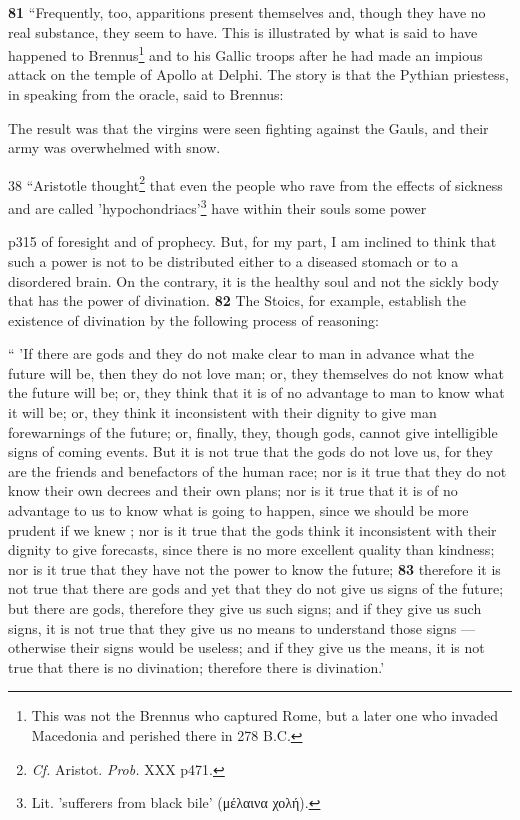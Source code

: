 \textbf{81} ``Frequently, too, apparitions present themselves and, though they have no real substance, they seem to have. This is illustrated by what is said to have happened to Brennus\texthebrew{}\footnote{This was not the Brennus who captured Rome, but a later one who invaded Macedonia and perished there in 278 B.C.

} and to his Gallic troops after he had made an impious attack on the temple of Apollo at Delphi. The story is that the Pythian priestess, in speaking from the oracle, said to Brennus:

The result was that the virgins were seen fighting against the Gauls, and their army was overwhelmed with snow.

38
``Aristotle thought\texthebrew{}\footnote{\emph{Cf.} Aristot. \emph{Prob.} XXX p471.

} that even the people who rave from the effects of sickness and are called 'hypochondriacs'\texthebrew{}\footnote{Lit. 'sufferers from black bile' (\textgreek{μέλαινα χολή}).

} have within their souls some power

p315 of foresight and of prophecy. But, for my part, I am inclined to think that such a power is not to be distributed either to a diseased stomach or to a disordered brain. On the contrary, it is the healthy soul and not the sickly body that has the power of divination. \textbf{82} The Stoics, for example, establish the existence of divination by the following process of reasoning:

`` 'If there are gods and they do not make clear to man in advance what the future will be, then they do not love man; or, they themselves do not know what the future will be; or, they think that it is of no advantage to man to know what it will be; or, they think it inconsistent with their dignity to give man forewarnings of the future; or, finally, they, though gods, cannot give intelligible signs of coming events. But it is not true that the gods do not love us, for they are the friends and benefactors of the human race; nor is it true that they do not know their own decrees and their own plans; nor is it true that it is of no advantage to us to know what is going to happen, since we should be more prudent if we knew ; nor is it true that the gods think it inconsistent with their dignity to give forecasts, since there is no more excellent quality than kindness; nor is it true that they have not the power to know the future; \textbf{83} therefore it is not true that there are gods and yet that they do not give us signs of the future; but there are gods, therefore they give us such signs; and if they give us such signs, it is not true that they give us no means to understand those signs \texthebrew{—} otherwise their signs would be useless; and if they give us the means, it is not true that there is no divination; therefore there is divination.'

